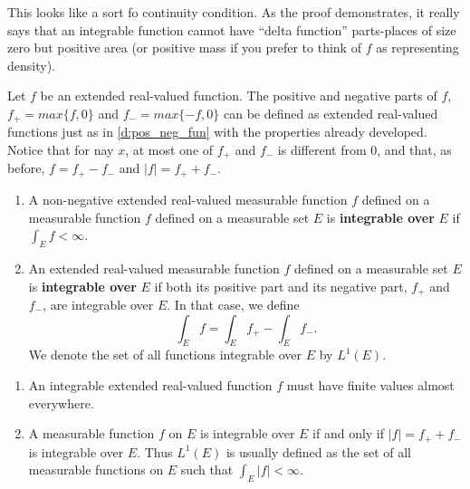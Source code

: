 \begin{rmk}%
	This looks like a sort fo continuity condition. As the proof demonstrates, it 
	really says that an integrable function cannot have ``delta function'' 
	parts-places of size zero but positive area (or positive mass if you prefer to 
	think of $f$ as representing density). 
\end{rmk}

\begin{rmk}%
	Let $f$ be an extended real-valued function. The positive and negative parts of 
	$f$, $f_+ = max\{f, 0\}$ and $f_- = max\{-f, 0\}$ can be defined as extended 
	real-valued functions just as in \ref{d:pos_neg_fun} with the properties already 
	developed. Notice that for nay $x$, at most one of $f_+$ and $f_-$ is different 
	from 0, and that, as before, $f = f_+ - f_-$ and $|f| = f_+ + f_-$. 
\end{rmk}


\begin{defn} %
	\begin{enumerate}
	\item A non-negative extended real-valued measurable function $f$ defined on a 
	measurable function $f$ defined on a measurable set $E$ is \textbf{integrable over} 
	$E$ if $\int_Ef<\infty$. 
	\item An extended real-valued measurable function $f$ defined on a measurable 
	set $E$ is \textbf{integrable over} $E$ if both its positive part and its 
	negative part, $f_+$ and $f_-$, are integrable over $E$. In that case, we define 
	\begin{equation*}
		\int_E f = \int_Ef_+-\int_Ef_-.
	\end{equation*}
	We denote the set of all functions integrable over $E$ by $L^1(E)$. 
	\end{enumerate}
\end{defn}

\begin{rmk}%
\begin{enumerate}
	\item An integrable extended real-valued function $f$ must have finite values 
	almost everywhere. 
	\item A measurable function $f$ on $E$ is integrable over $E$ if and only if 
	$|f| = f_++f_-$ is integrable over $E$. Thus $L^1(E)$ is usually defined as the 
	set of all measurable functions on $E$ such that $\int_E|f|<\infty$. 
\end{enumerate}
\end{rmk}

